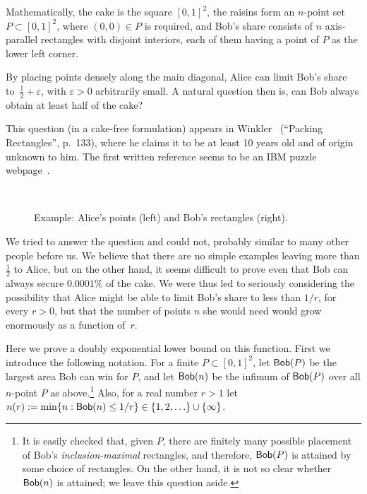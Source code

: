 \documentclass[11pt]{article}
\newcommand\eps{\varepsilon}
\DeclareMathOperator{\bob}{{\sf Bob}}
\begin{document}
Mathematically, the cake is the square $[0,1]^2$, the raisins
form an $n$-point set $P\subset [0,1]^2$, where
$(0,0)\in P$ is required, and Bob's share consists of 
$n$ axis-parallel rectangles with disjoint
interiors, each of them having a point of $P$ as the
lower left corner.

By placing points densely along the main diagonal,
Alice can limit Bob's share to~$\frac 12+\eps$,
with $\eps>0$ arbitrarily small.
A natural question then is, can Bob always obtain
 at least half of the cake?

This question (in a cake-free formulation) appears in
Winkler~\cite{Win07} (``Packing Rectangles'', p.~133),
where he claims it to be at least 10 years old and of
origin unknown to him. The first written reference seems
to be an IBM puzzle webpage~\cite{IBM04}.


\begin{figure}[tbh]
\centering
{}
~~~~~~~~~~~~~~~~~~
\caption{\label{f:example} Example: Alice's points (left)
and Bob's rectangles (right).}
\end{figure}



We tried to answer the question and could not, probably similar to many 
other people before us. We believe that there are no simple examples
leaving more than $\frac 12$ to Alice, but on the other hand,
it seems difficult to prove even that Bob can always secure
$0.0001\%$ of the cake. We were thus led to seriously considering
the possibility that Alice might be able
to limit Bob's share to less than $1/r$, for every $r>0$,
but that the number of points $n$ she would need 
would grow enormously as a function of~$r$.

Here we prove a doubly exponential lower bound on this function.
First we introduce the following notation. For a finite
$P\subset[0,1]^2$,
let $\bob(P)$ be the largest area Bob can win for $P$, and
let $\bob(n)$ be the infimum of $\bob(P)$ over all $n$-point $P$
as above.\footnote{It is easily checked that, given $P$,
there are finitely many possible placement of 
Bob's \emph{inclusion-maximal} rectangles, and therefore,
$\bob(P)$ is attained by some choice of rectangles.
On the other hand, it is not so clear whether
$\bob(n)$ is attained; we leave this question
aside.} Also, for a real number $r>1$ let
$n(r):=\min\{n: \bob(n)\le 1/r\} \in \{1,2,\ldots\}\cup \{\infty\}$.
\end{document}
